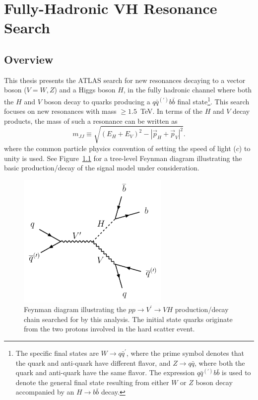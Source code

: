 \graphicspath{{Ch5_VHqqbb/figures/}}

\chapter{Fully-Hadronic VH Resonance Search}

\section{Overview}
This thesis presents the ATLAS search for new resonances decaying to a vector boson ($V = W,Z$) and a Higgs boson $H$, in the fully hadronic channel where both the $H$ and $V$ boson decay to quarks producing a $q\bar{q}^{(\prime)}b\bar{b}$ final state\footnote{The specific final states are $W \rightarrow q \bar{q}^\prime$, where the prime symbol denotes that the quark and anti-quark have different flavor, and $Z \rightarrow q\bar{q}$, where both the quark and anti-quark have the same flavor. The expression $q\bar{q}^{(\prime)}b\bar{b}$ is used to denote the general final state resulting from either $W$ or $Z$ boson decay accompanied by an $H \to b\bar{b}$ decay.}.
This search focuses on new resonances with mass $\geq 1.5$~TeV.
In terms of the $H$ and $V$ decay products, the mass of such a resonance can be written as
\begin{equation}
    m_{JJ} \equiv \sqrt{
        \left(E_H + E_V\right)^2
        -
        \left| \vec{p}_H + \vec{p}_V\right|^2
    }.
\end{equation}
where the common particle physics convention of setting the speed of light ($c$) to unity is used.
See Figure~\ref{fig:feynman_diagram_VHqqbb} for a tree-level Feynman diagram illustrating the basic production/decay of the signal model under consideration.

\begin{figure}
	\centering
	\includegraphics[width=0.65\textwidth,origin=c]{VH____qqbb_Feynman_Diagram}
	\caption{
	Feynman diagram illustrating the $pp \rightarrow V^\prime \rightarrow VH$ production/decay chain searched for by this analysis.
	The initial state quarks originate from the two protons involved in the hard scatter event.
	}
	\label{fig:feynman_diagram_VHqqbb}
\end{figure}

